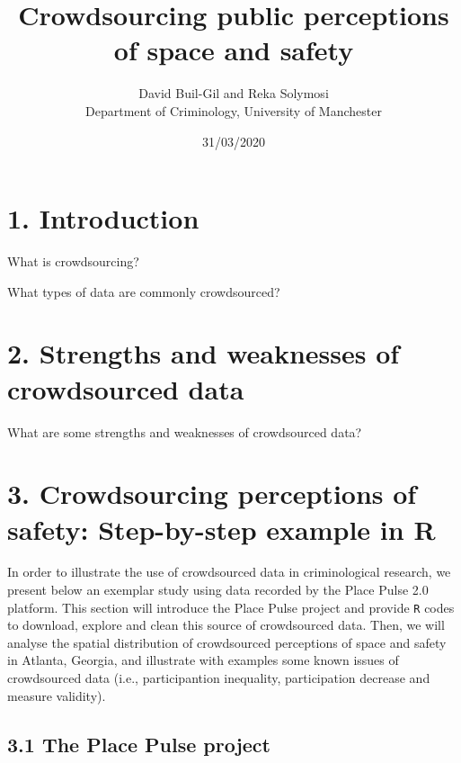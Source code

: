 \documentclass[
]{article}
\title{Crowdsourcing public perceptions of space and safety}
\author{David Buil-Gil and Reka Solymosi\\
Department of Criminology, University of Manchester}
\date{31/03/2020}
\begin{document}
\maketitle

\hypertarget{introduction}{%
\section{1. Introduction}\label{introduction}}

What is crowdsourcing?

What types of data are commonly crowdsourced?

\hypertarget{strengths-and-weaknesses-of-crowdsourced-data}{%
\section{2. Strengths and weaknesses of crowdsourced
data}\label{strengths-and-weaknesses-of-crowdsourced-data}}

What are some strengths and weaknesses of crowdsourced data?

\hypertarget{crowdsourcing-perceptions-of-safety-step-by-step-example-in-r}{%
\section{3. Crowdsourcing perceptions of safety: Step-by-step example in
R}\label{crowdsourcing-perceptions-of-safety-step-by-step-example-in-r}}

In order to illustrate the use of crowdsourced data in criminological
research, we present below an exemplar study using data recorded by the
Place Pulse 2.0 platform. This section will introduce the Place Pulse
project and provide \texttt{R} codes to download, explore and clean this
source of crowdsourced data. Then, we will analyse the spatial
distribution of crowdsourced perceptions of space and safety in Atlanta,
Georgia, and illustrate with examples some known issues of crowdsourced
data (i.e., participantion inequality, participation decrease and
measure validity).

\hypertarget{the-place-pulse-project}{%
\subsection{3.1 The Place Pulse project}\label{the-place-pulse-project}}
\end{document}
